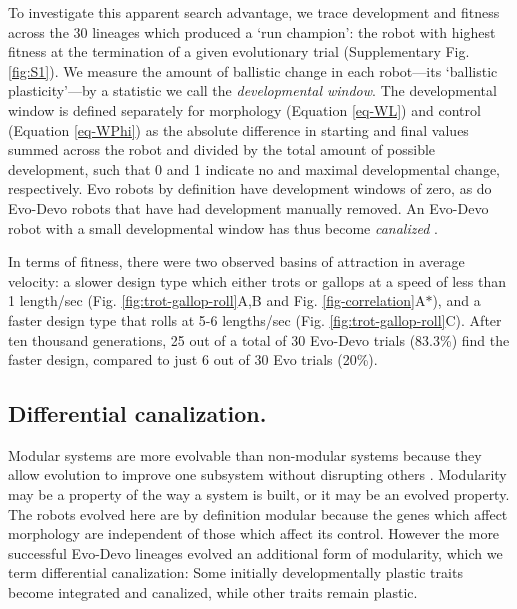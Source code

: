 To investigate this apparent search advantage, we trace development and fitness across the 30 lineages which produced a `run champion': the robot with highest fitness at the termination of a given evolutionary trial (Supplementary Fig. \ref{fig:S1}).%
We measure the amount of ballistic change in each robot---its `ballistic plasticity'---by a statistic we call the \textit{developmental window}.
The developmental window is defined separately for morphology (Equation \ref{eq-WL}) and control (Equation \ref{eq-WPhi}) as the absolute difference in starting and final values summed across the robot and divided by the total amount of possible development, such that 0 and 1 indicate no and maximal developmental change, respectively.
Evo robots by definition have development windows of zero, as do Evo-Devo robots that have had development manually removed.
An Evo-Devo robot with a small developmental window has thus become \textit{canalized} \cite{waddington1942canalization}.


In terms of fitness, there were two observed basins of attraction in average velocity: a slower design type which either trots or gallops at a speed of less than 1 length/sec (Fig. \ref{fig:trot-gallop-roll}A,B and Fig. \ref{fig-correlation}A{\Large$\ast$}), and a faster design type that rolls at 5-6 lengths/sec (Fig. \ref{fig:trot-gallop-roll}C). 
After ten thousand generations, 25 out of a total of 30 Evo-Devo trials (83.3\%) find the faster design, compared to just 6 out of 30 Evo trials (20\%).


\subsection*{Differential canalization.}

Modular systems are more evolvable than non-modular systems because they allow evolution to improve one subsystem without disrupting others \cite{wagner1996perspective,lipson2007principles}.
Modularity may be a property of the way a system is built, or it may be an evolved property.
The robots evolved here are by definition modular because the genes which affect morphology are independent of those which affect its control.
However the more successful Evo-Devo lineages evolved an additional form of modularity, which we term differential canalization:
Some initially developmentally plastic traits become integrated and canalized, while other traits remain plastic.


